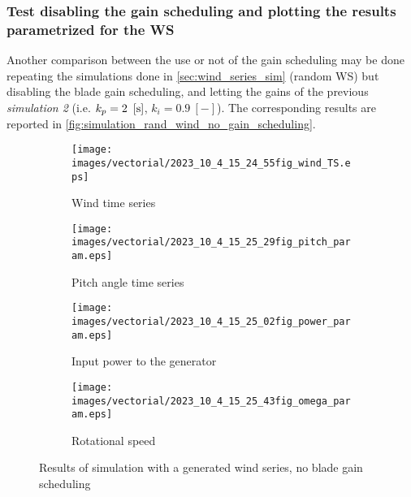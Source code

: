 \subsubsection[Parametrization with respect to the wind speed]{Test disabling the gain scheduling and plotting the results parametrized for the WS}\label{subsec:gain_disabled}
Another comparison between the use or not of the gain scheduling may be done repeating the simulations done in \autoref{sec:wind_series_sim} (random WS) but disabling the blade gain scheduling, and letting the gains of the previous \textit{simulation 2} (i.e. $k_p = 2 \ \left[\si{\second}\right]$, $k_i=0.9 \ [-]$). The corresponding results are reported in \autoref{fig:simulation_rand_wind_no_gain_scheduling}.
\begin{figure}[htb]
  \begin{subfigure}{0.5\columnwidth}
    \centering
    \texttt{[image: images/vectorial/2023\_10\_4\_15\_24\_55fig\_wind\_TS.eps]}
    \caption{Wind time series}
    \label{fig:2023_05_8_22_43_35fig_wind_TS.eps}
  \end{subfigure}
  \begin{subfigure}{0.5\columnwidth}
    \centering
    \texttt{[image: images/vectorial/2023\_10\_4\_15\_25\_29fig\_pitch\_param.eps]}
    \caption{Pitch angle time series}
    \label{fig:2023_05_8_22_44_05fig_pitch_param}
  \end{subfigure}
  \begin{subfigure}{0.5\columnwidth}
    \centering
    \texttt{[image: images/vectorial/2023\_10\_4\_15\_25\_02fig\_power\_param.eps]}
    \caption{Input power to the generator}
    \label{fig:2023_05_8_22_44_15fig_power_param}
  \end{subfigure}
  \begin{subfigure}{0.5\columnwidth}
    \centering
    \texttt{[image: images/vectorial/2023\_10\_4\_15\_25\_43fig\_omega\_param.eps]}
    \caption{Rotational speed}
    \label{fig:2023_05_8_23_17_57fig_omega_param}
  \end{subfigure}
  \caption{Results of simulation with a generated wind series, no blade gain scheduling}
  \label{fig:simulation_rand_wind_no_gain_scheduling}
\end{figure}


